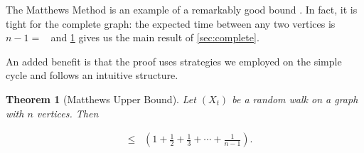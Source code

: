 \documentclass[12pt]{article}
\newtheorem{theorem}{Theorem}
\theoremstyle{definition}
\DeclareMathOperator{\tcov}{t_\textrm{cov}}      %
\DeclareMathOperator{\hit}{t_{\textrm{hit}}}     %
\begin{document}
The Matthews Method is an example of a remarkably good bound \cite{LP17}.
In fact, it is tight for the complete graph:
the expected time between any two vertices
is $n-1 = \hit$ and \cref{thm:matthews_up} gives
us the main result of \cref{sec:complete}.

An added benefit is that the proof uses strategies we employed on the
simple cycle and follows an intuitive structure.

\begin{theorem}[Matthews Upper Bound]
Let $(X_t)$ be a random walk on a graph with $n$ vertices. Then \label{thm:matthews_up}
\end{theorem}
\begin{align}
\tcov &\leq \hit \left(1 + \frac{1}{2} + \frac{1}{3} + \cdots + \frac{1}{n-1} \right). \nonumber
\end{align}
\end{document}
